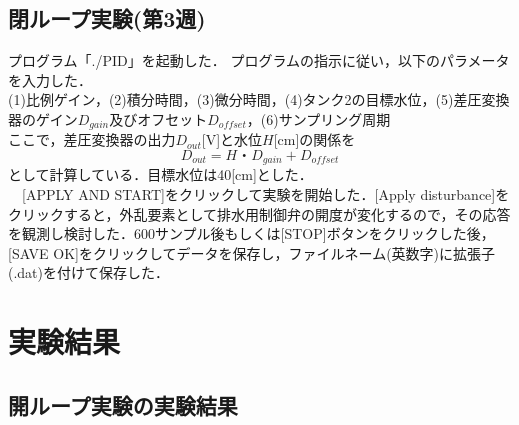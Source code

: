 \documentclass[12pt]{jsarticle}
\begin{document}
\subsection{閉ループ実験(第3週)}
プログラム「./PID」を起動した．
プログラムの指示に従い，以下のパラメータを入力した．\\
(1)比例ゲイン，(2)積分時間，(3)微分時間，(4)タンク2の目標水位，(5)差圧変換器のゲイン$D_{gain}$及びオフセット$D_{offset}$，(6)サンプリング周期\\
ここで，差圧変換器の出力$D_{out}$[V]と水位$H$[cm]の関係を
\begin{equation}
  D_{out} = H・D_{gain} + D_{offset}
\end{equation}
として計算している．目標水位は40[cm]とした．\\
　[APPLY AND START]をクリックして実験を開始した．[Apply disturbance]をクリックすると，外乱要素として排水用制御弁の開度が変化するので，その応答を観測し検討した．600サンプル後もしくは[STOP]ボタンをクリックした後，[SAVE OK]をクリックしてデータを保存し，ファイルネーム(英数字)に拡張子(.dat)を付けて保存した．

\section{実験結果}
\subsection{開ループ実験の実験結果}
\end{document}
